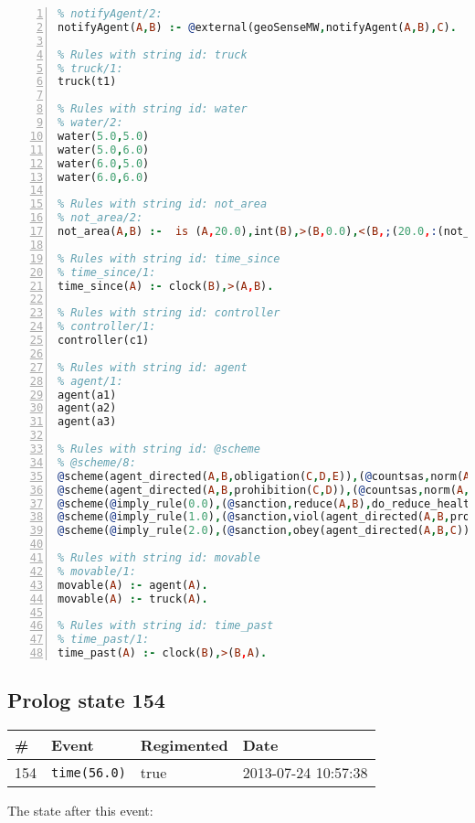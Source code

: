 \documentclass[11pt]{article}\usepackage[utf8]{inputenc}\usepackage{geometry}
\begin{document}
\begin{lstlisting}[language=Prolog, numbers=left]
% Rules with string id: notifyAgent
% notifyAgent/2:
notifyAgent(A,B) :- @external(geoSenseMW,notifyAgent(A,B),C).

% Rules with string id: truck
% truck/1:
truck(t1)

% Rules with string id: water
% water/2:
water(5.0,5.0)
water(5.0,6.0)
water(6.0,5.0)
water(6.0,6.0)

% Rules with string id: not_area
% not_area/2:
not_area(A,B) :-  is (A,20.0),int(B),>(B,0.0),<(B,;(20.0,:(not_area(A,B), is (-(B),20.0)))),int(A),>(A,0.0),<(A,;(20.0,:(area(A,B),-(int(A))))),int(B),>(A,0.0),>(B,0.0),<(A,21.0),<(B,21.0).

% Rules with string id: time_since
% time_since/1:
time_since(A) :- clock(B),>(A,B).

% Rules with string id: controller
% controller/1:
controller(c1)

% Rules with string id: agent
% agent/1:
agent(a1)
agent(a2)
agent(a3)

% Rules with string id: @scheme
% @scheme/8:
@scheme(agent_directed(A,B,obligation(C,D,E)),(@countsas,norm(A,B,F,obligation(C,D,E)),F),false,(listTrue(C)),(time_past(D)),false,[plus(viol(agent_directed(A,B,obligation(C,D,E))))|[]],[plus(obey(agent_directed(A,B,obligation(C,D,E))))|[]])
@scheme(agent_directed(A,B,prohibition(C,D)),(@countsas,norm(A,B,E,prohibition(C,D)),E),(listTrue(C)),false,(false),false,[plus(viol(agent_directed(A,B,prohibition(C,D))))|[]],[plus(obey(agent_directed(A,B,prohibition(C,D))))|[]])
@scheme(@imply_rule(0.0),(@sanction,reduce(A,B),do_reduce_health(A,B),notifyAgent(A,changed(status))),true,false,false,false,[min(reduce(A,B))|[]],[])
@scheme(@imply_rule(1.0),(@sanction,viol(agent_directed(A,B,prohibition(C,D))),do_sanction(D)),true,false,false,false,[min(viol(agent_directed(A,B,prohibition(C,D))))|[]],[])
@scheme(@imply_rule(2.0),(@sanction,obey(agent_directed(A,B,C))),true,false,false,false,[min(obey(agent_directed(A,B,C)))|[]],[])

% Rules with string id: movable
% movable/1:
movable(A) :- agent(A).
movable(A) :- truck(A).

% Rules with string id: time_past
% time_past/1:
time_past(A) :- clock(B),>(B,A).

\end{lstlisting}
\clearpage 
\subsection{Prolog state 154}
\begin{table}[ht]
\centering 
\begin{tabular}{l l l l} 
\textbf{\#} & \textbf{Event} & \textbf{Regimented} & \textbf{Date} \\ [0.5ex] 
\hline
154&\texttt{time(56.0)}&true&2013-07-24 10:57:38\\ [1ex] \hline\end{tabular}
\end{table}
The state after this event:
\end{document}
